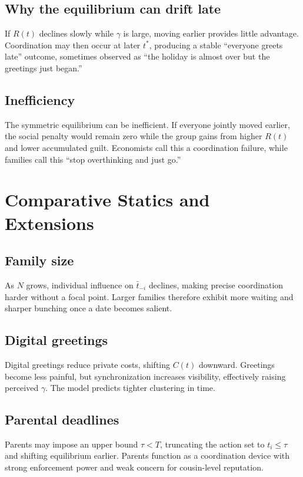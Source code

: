 \documentclass[AER]{AEA}
\begin{document}
\subsection{Why the equilibrium can drift late}
If $R(t)$ declines slowly while $\gamma$ is large, moving earlier provides little advantage. Coordination may then occur at later $t^*$, producing a stable ``everyone greets late'' outcome, sometimes observed as ``the holiday is almost over but the greetings just began.''

\subsection{Inefficiency}
The symmetric equilibrium can be inefficient. If everyone jointly moved earlier, the social penalty would remain zero while the group gains from higher $R(t)$ and lower accumulated guilt. Economists call this a coordination failure, while families call this ``stop overthinking and just go.''

\section{Comparative Statics and Extensions}

\subsection{Family size}
As $N$ grows, individual influence on $\bar t_{-i}$ declines, making precise coordination harder without a focal point. Larger families therefore exhibit more waiting and sharper bunching once a date becomes salient.

\subsection{Digital greetings}
Digital greetings reduce private costs, shifting $C(t)$ downward. Greetings become less painful, but synchronization increases visibility, effectively raising perceived $\gamma$. The model predicts tighter clustering in time.

\subsection{Parental deadlines}
Parents may impose an upper bound $\tau<T$, truncating the action set to $t_i\le\tau$ and shifting equilibrium earlier. Parents function as a coordination device with strong enforcement power and weak concern for cousin-level reputation.
\end{document}
